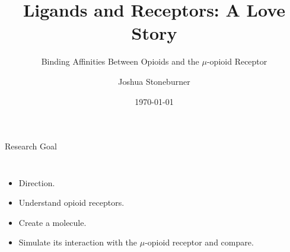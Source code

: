 \documentclass{beamer}
\title{Ligands and Receptors: A Love Story}
\subtitle{Binding Affinities Between Opioids and the $\mu$-opioid Receptor}
\date{\today}
\author{Joshua Stoneburner}
\institute{\url{https://github.com/JoshuaKSt}}
\begin{document}
\maketitle

\begin{frame}{Research Goal}

    \begin{columns}
            \begin{itemize}
            \item Direction.
            \item Understand opioid receptors.
            \item Create a molecule. 
            \item Simulate its interaction with the $\mu$-opioid receptor and compare.
      \end{itemize}
    \end{columns}
    \end{frame}
\end{document}
